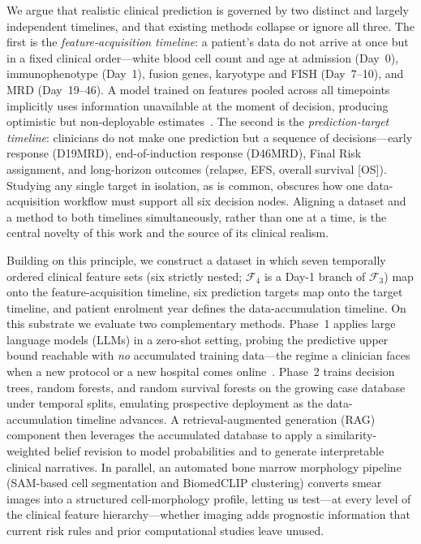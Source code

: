 \documentclass[pdflatex,sn-nature]{sn-jnl}
\begin{document}
We argue that realistic clinical prediction is governed by two
distinct and largely independent timelines, and that existing methods
collapse or ignore all three.
The first is the \emph{feature-acquisition timeline}: a patient's data
do not arrive at once but in a fixed clinical order—white blood cell
count and age at admission (Day~0), immunophenotype (Day~1),
fusion genes, karyotype and FISH (Day~7--10), and
MRD (Day~19--46).
A model trained on features pooled across all timepoints implicitly
uses information unavailable at the moment of decision, producing
optimistic but non-deployable estimates~\cite{[CITE:Steyerberg2019]}.
The second is the \emph{prediction-target timeline}: clinicians do not
make one prediction but a sequence of decisions—early response
(D19MRD), end-of-induction response (D46MRD), Final Risk assignment,
and long-horizon outcomes (relapse, EFS, overall survival [OS]).
Studying any single target in isolation, as is common, obscures how one
data-acquisition workflow must support all six decision nodes.
Aligning a dataset and a method to both timelines simultaneously,
rather than one at a time, is the central novelty of this work and the
source of its clinical realism.

Building on this principle, we construct a dataset in which seven
temporally ordered clinical feature sets (six strictly nested;
$\mathcal{F}_4$ is a Day-1 branch of $\mathcal{F}_3$) map onto
the feature-acquisition timeline, six prediction targets map onto the
target timeline, and patient enrolment year defines the
data-accumulation timeline.
On this substrate we evaluate two complementary methods.
Phase~1 applies large language models (LLMs) in a zero-shot setting,
probing the predictive upper bound reachable with \emph{no} accumulated
training data—the regime a clinician faces when a new protocol or a new
hospital comes online~\cite{[CITE:Phaterpekar2026]}.
Phase~2 trains decision trees, random forests, and random survival
forests on the growing case database under temporal splits, emulating
prospective deployment as the data-accumulation timeline advances.
A retrieval-augmented generation (RAG) component then leverages the
accumulated database to apply a similarity-weighted belief revision to
model probabilities and to generate interpretable clinical narratives.
In parallel, an automated bone marrow morphology pipeline (SAM-based
cell segmentation and BiomedCLIP clustering) converts smear images
into a structured cell-morphology profile, letting us test—at every
level of the clinical feature hierarchy—whether imaging adds
prognostic information that current risk rules and prior computational
studies leave unused.
\end{document}
